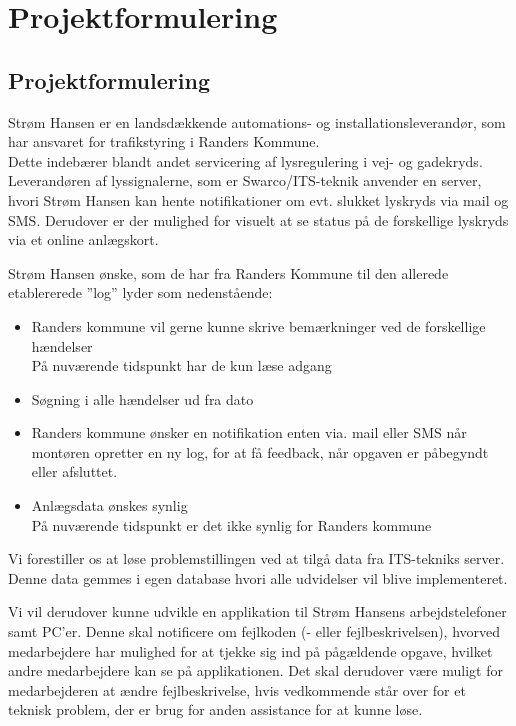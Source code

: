 
	\chapter{Projektformulering}
	
	\section{Projektformulering}
	Strøm Hansen er en landsdækkende automations- og installationsleverandør, som har ansvaret for trafikstyring i Randers Kommune. \\Dette indebærer blandt andet servicering af lysregulering i vej- og gadekryds.
	Leverandøren af lyssignalerne, som er Swarco/ITS-teknik anvender en server, hvori Strøm Hansen kan hente notifikationer om evt. slukket lyskryds via mail og SMS. Derudover er der mulighed for visuelt at se status på de forskellige lyskryds via et online anlægskort.
	
	Strøm Hansen ønske, som de har fra Randers Kommune til den allerede etablererede ”log” lyder som nedenstående:
	
	\begin{itemize}[-]
		\item Randers kommune vil gerne kunne skrive bemærkninger ved de forskellige hændelser\\
		På nuværende tidspunkt har de kun læse adgang\\
		
		\item Søgning i alle hændelser ud fra dato\\
		
		\item Randers kommune ønsker en notifikation enten via. mail eller SMS når montøren opretter en ny log, for at få feedback, når opgaven er påbegyndt eller afsluttet.\\
		
		\item Anlægsdata ønskes synlig \\
		På nuværende tidspunkt er det ikke synlig for Randers kommune
	\end{itemize}
		
	Vi forestiller os at løse problemstillingen ved at tilgå data fra ITS-tekniks server. 
	Denne data gemmes i egen database hvori alle udvidelser vil blive implementeret.

	Vi vil derudover kunne udvikle en applikation til Strøm Hansens arbejdstelefoner samt PC'er.
	Denne skal notificere om fejlkoden (- eller fejlbeskrivelsen), hvorved medarbejdere har mulighed for at tjekke sig ind på pågældende opgave, hvilket andre medarbejdere kan se på applikationen. Det skal derudover være muligt for medarbejderen at ændre fejlbeskrivelse, hvis vedkommende står over for et teknisk problem, der er brug for anden assistance for at kunne løse. \\
	


